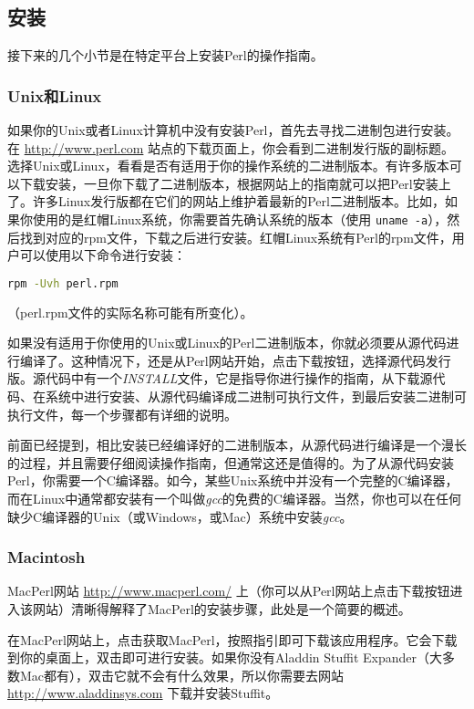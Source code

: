 \subsection{安装}
接下来的几个小节是在特定平台上安装Perl的操作指南。

\subsubsection{Unix和Linux}
如果你的Unix或者Linux计算机中没有安装Perl，首先去寻找二进制包进行安装。在 \href{http://www.perl.com}{http://www.perl.com} 站点的下载页面上，你会看到二进制发行版的副标题。选择Unix或Linux，看看是否有适用于你的操作系统的二进制版本。有许多版本可以下载安装，一旦你下载了二进制版本，根据网站上的指南就可以把Perl安装上了。许多Linux发行版都在它们的网站上维护着最新的Perl二进制版本。比如，如果你使用的是红帽Linux系统，你需要首先确认系统的版本（使用 \verb|uname -a|），然后找到对应的rpm文件，下载之后进行安装。红帽Linux系统有Perl的rpm文件，用户可以使用以下命令进行安装：

\begin{lstlisting}[language=bash]
rpm -Uvh perl.rpm
\end{lstlisting}
\noindent （perl.rpm文件的实际名称可能有所变化）。

如果没有适用于你使用的Unix或Linux的Perl二进制版本，你就必须要从源代码进行编译了。这种情况下，还是从Perl网站开始，点击下载按钮，选择源代码发行版。源代码中有一个\textit{INSTALL}文件，它是指导你进行操作的指南，从下载源代码、在系统中进行安装、从源代码编译成二进制可执行文件，到最后安装二进制可执行文件，每一个步骤都有详细的说明。

前面已经提到，相比安装已经编译好的二进制版本，从源代码进行编译是一个漫长的过程，并且需要仔细阅读操作指南，但通常这还是值得的。为了从源代码安装Perl，你需要一个C编译器。如今，某些Unix系统中并没有一个完整的C编译器，而在Linux中通常都安装有一个叫做\textit{gcc}的免费的C编译器。当然，你也可以在任何缺少C编译器的Unix（或Windows，或Mac）系统中安装\textit{gcc}。

\subsubsection{Macintosh}
MacPerl网站 \href{http://www.macperl.com/}{http://www.macperl.com/} 上（你可以从Perl网站上点击下载按钮进入该网站）清晰得解释了MacPerl的安装步骤，此处是一个简要的概述。

在MacPerl网站上，点击获取MacPerl，按照指引即可下载该应用程序。它会下载到你的桌面上，双击即可进行安装。如果你没有Aladdin Stuffit Expander（大多数Mac都有），双击它就不会有什么效果，所以你需要去网站 \href{http://www.aladdinsys.com}{http://www.aladdinsys.com} 下载并安装Stuffit。

